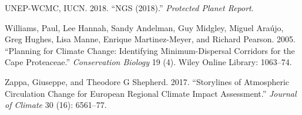 \documentclass[]{article}
\begin{document}
\leavevmode\hypertarget{ref-unep2018ngs}{}%
UNEP-WCMC, IUCN. 2018. ``NGS (2018).'' \emph{Protected Planet Report}.

\leavevmode\hypertarget{ref-williams2005planning}{}%
Williams, Paul, Lee Hannah, Sandy Andelman, Guy Midgley, Miguel Araújo, Greg Hughes, Lisa Manne, Enrique Martinez-Meyer, and Richard Pearson. 2005. ``Planning for Climate Change: Identifying Minimum-Dispersal Corridors for the Cape Proteaceae.'' \emph{Conservation Biology} 19 (4). Wiley Online Library: 1063--74.

\leavevmode\hypertarget{ref-zappa2017storylines}{}%
Zappa, Giuseppe, and Theodore G Shepherd. 2017. ``Storylines of Atmospheric Circulation Change for European Regional Climate Impact Assessment.'' \emph{Journal of Climate} 30 (16): 6561--77.
\end{document}
